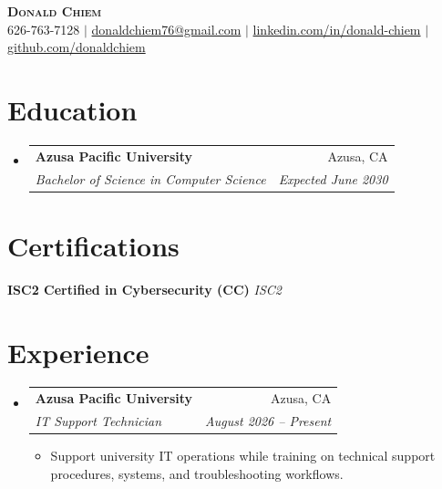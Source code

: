 \documentclass[letterpaper,11pt]{article}
\makeatletter
\newcommand{\resumeItem}[1]{
  \item\small{{#1 \vspace{-2pt}}}
}
\newcommand{\resumeSubheading}[4]{
  \vspace{-2pt}\item
    \begin{tabular*}{0.97\textwidth}[t]{l@{\extracolsep{\fill}}r}
      \textbf{#1} & #2 \\
      \textit{\small#3} & \textit{\small #4} \\
    \end{tabular*}\vspace{-7pt}
}
\newcommand{\resumeSubHeadingListStart}{\begin{itemize}[leftmargin=0.15in, label={}]}
\newcommand{\resumeSubHeadingListEnd}{\end{itemize}}
\newcommand{\resumeItemListStart}{\begin{itemize}}
\newcommand{\resumeItemListEnd}{\end{itemize}\vspace{-5pt}}
\makeatother
\begin{document}

\begin{center}
    \textbf{\Huge \scshape Donald Chiem} \\ \vspace{1pt}
    \small
    626-763-7128 $|$
    \href{mailto:donaldchiem76@gmail.com}{donaldchiem76@gmail.com} $|$
    \href{https://www.linkedin.com/in/donald-chiem/}{linkedin.com/in/donald-chiem} $|$
    \href{https://github.com/donaldchiem}{github.com/donaldchiem}
\end{center}


\section{Education}
\resumeSubHeadingListStart

\resumeSubheading
{\textbf{Azusa Pacific University}}{Azusa, CA}
{Bachelor of Science in Computer Science}{Expected June 2030}

\resumeSubHeadingListEnd


\section{Certifications}

\begin{itemize}[leftmargin=0.15in, label={}]
\small{
\item{
\textbf{ISC2 Certified in Cybersecurity (CC)} \hfill \textit{ISC2}
}}
\end{itemize}


\section{Experience}
\resumeSubHeadingListStart

\resumeSubheading
{Azusa Pacific University}{Azusa, CA}
{IT Support Technician}{August 2026 -- Present}

\resumeItemListStart
\resumeItem{Support university IT operations while training on technical support procedures, systems, and troubleshooting workflows.}
\resumeItemListEnd

\resumeSubHeadingListEnd

\end{document}
